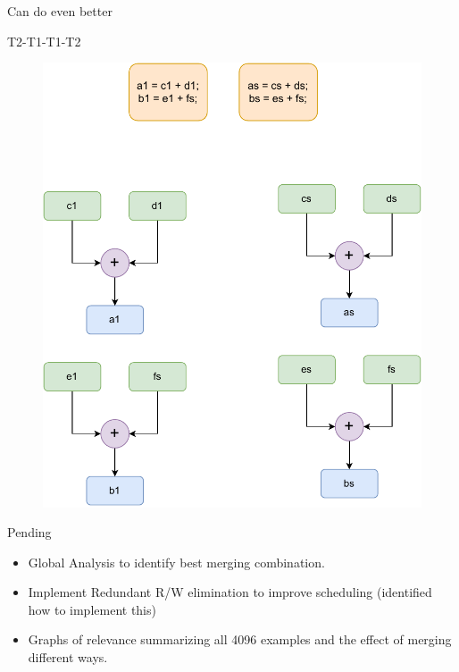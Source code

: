 \documentclass[notes, xcolor=dvipsnames]{beamer}
\begin{document}
    \begin{frame}{Can do even better}

        T2-T1-T1-T2
        \begin{figure}
            \includegraphics[scale=0.4]{FineGrainedMerge.pdf}
        \end{figure}

    \end{frame}

    \begin{frame}{Pending}

        \begin{itemize}
            \item Global Analysis to identify best merging combination. 
            \item Implement Redundant R/W elimination to improve scheduling (identified how to implement this)
            \item Graphs of relevance summarizing all 4096 examples and the effect of merging different ways.
        \end{itemize}

    \end{frame}
\end{document}
